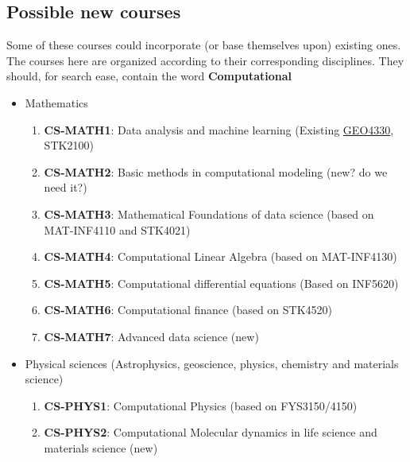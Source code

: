 \documentclass[%
oneside,                 %
final,                   %
10pt]{article}
\begin{document}
\noindent



\subsection{Possible new courses}
Some of these courses could incorporate (or base themselves upon) existing ones. The courses here are organized according to their corresponding disciplines. They should, for search ease, contain the word \textbf{Computational} 
\begin{itemize}
\item Mathematics
\begin{enumerate}

\item \textbf{CS-MATH1}: Data analysis and machine learning (Existing \href{{http://www.uio.no/studier/emner/matnat/geofag/GEO4330/}}{GEO4330}, STK2100)

\item \textbf{CS-MATH2}: Basic methods in computational modeling   (new? do we need it?)

\item \textbf{CS-MATH3}: Mathematical Foundations of data science (based on MAT-INF4110 and STK4021)

\item \textbf{CS-MATH4}: Computational Linear Algebra (based on MAT-INF4130)

\item \textbf{CS-MATH5}: Computational differential equations (Based on INF5620)

\item \textbf{CS-MATH6}: Computational finance (based on STK4520)

\item \textbf{CS-MATH7}: Advanced data science (new)

\end{enumerate}

\noindent
\item Physical sciences (Astrophysics, geoscience, physics, chemistry and materials science)
\begin{enumerate}

\item \textbf{CS-PHYS1}: Computational Physics (based on FYS3150/4150)

\item \textbf{CS-PHYS2}: Computational Molecular dynamics in life science and materials science (new)


\end{enumerate}
\end{itemize}
\end{document}
